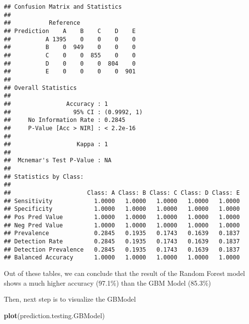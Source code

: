 \documentclass[]{article}
\newenvironment{Shaded}{\begin{snugshade}}{\end{snugshade}}
\newcommand{\KeywordTok}[1]{\textcolor[rgb]{0.13,0.29,0.53}{\textbf{#1}}}
\newcommand{\NormalTok}[1]{#1}
\newcommand{\OperatorTok}[1]{\textcolor[rgb]{0.81,0.36,0.00}{\textbf{#1}}}
\newcommand{\StringTok}[1]{\textcolor[rgb]{0.31,0.60,0.02}{#1}}
\begin{document}
\begin{Shaded}
\end{Shaded}

\begin{verbatim}
## Confusion Matrix and Statistics
## 
##           Reference
## Prediction    A    B    C    D    E
##          A 1395    0    0    0    0
##          B    0  949    0    0    0
##          C    0    0  855    0    0
##          D    0    0    0  804    0
##          E    0    0    0    0  901
## 
## Overall Statistics
##                                      
##                Accuracy : 1          
##                  95% CI : (0.9992, 1)
##     No Information Rate : 0.2845     
##     P-Value [Acc > NIR] : < 2.2e-16  
##                                      
##                   Kappa : 1          
##                                      
##  Mcnemar's Test P-Value : NA         
## 
## Statistics by Class:
## 
##                      Class: A Class: B Class: C Class: D Class: E
## Sensitivity            1.0000   1.0000   1.0000   1.0000   1.0000
## Specificity            1.0000   1.0000   1.0000   1.0000   1.0000
## Pos Pred Value         1.0000   1.0000   1.0000   1.0000   1.0000
## Neg Pred Value         1.0000   1.0000   1.0000   1.0000   1.0000
## Prevalence             0.2845   0.1935   0.1743   0.1639   0.1837
## Detection Rate         0.2845   0.1935   0.1743   0.1639   0.1837
## Detection Prevalence   0.2845   0.1935   0.1743   0.1639   0.1837
## Balanced Accuracy      1.0000   1.0000   1.0000   1.0000   1.0000
\end{verbatim}

Out of these tables, we can conclude that the result of the Random
Forest model shows a much higher accuracy (97.1\%) than the GBM Model
(85.3\%)

Then, next step is to visualize the GBModel

\begin{Shaded}
\begin{Highlighting}[]
\KeywordTok{plot}\NormalTok{(prediction.testing.GBModel)}
\end{Highlighting}
\end{Shaded}
\end{document}
